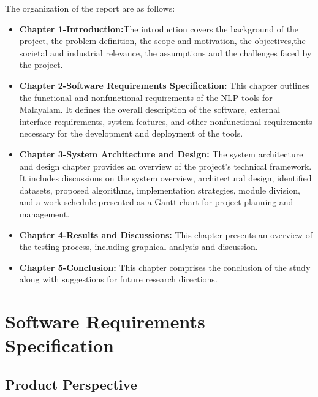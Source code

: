 \documentclass[12pt,a4paper,titlepage]{report}
\begin{document}
	The organization of the report are as follows:
	\begin{itemize}
		\item 	\textbf{Chapter 1-Introduction:}The introduction covers the background of the project, the problem definition, the scope and motivation, the objectives,the societal and industrial relevance, the assumptions and the challenges faced by the project.
		
		\item \textbf{Chapter 2-Software Requirements Specification:} This chapter outlines the functional and nonfunctional requirements of the NLP tools for Malayalam. It defines the overall description of the software, external interface requirements, system features, and other nonfunctional requirements necessary for the development and deployment of the tools.
		
		\item \textbf{Chapter 3-System Architecture and Design:} The system architecture and design chapter provides an overview of the project’s technical framework. It includes discussions on the system overview, architectural design, identified datasets, proposed algorithms, implementation strategies, module division, and a work schedule presented as a Gantt chart for project planning and management.
		
		\item \textbf{Chapter 4-Results and Discussions:} 
		This chapter presents an overview of the testing process, including graphical analysis and discussion. 
			
		\item \textbf{Chapter 5-Conclusion:}
		This chapter comprises the conclusion of the study along with suggestions for future research directions. 
	  \end{itemize}
	
	
	
	
	
	
	
	\chapter{Software Requirements Specification}
	
  
	
	
	\section{Product Perspective}
\end{document}

